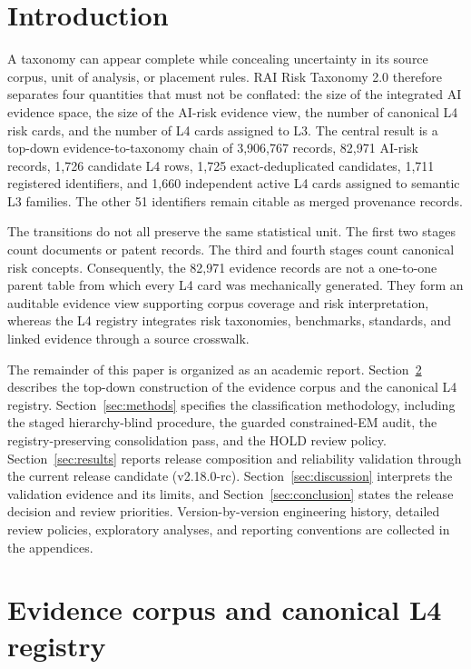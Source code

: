 \documentclass[11pt,a4paper]{article}
\begin{document}
\section{Introduction}
\label{sec:intro}

A taxonomy can appear complete while concealing uncertainty in its source
corpus, unit of analysis, or placement rules. RAI Risk Taxonomy 2.0 therefore
separates four quantities that must not be conflated: the size of the integrated
AI evidence space, the size of the AI-risk evidence view, the number of
canonical L4 risk cards, and the number of L4 cards assigned to L3. The central
result is a top-down evidence-to-taxonomy chain of 3,906,767 records, 82,971
AI-risk records, 1,726 candidate L4 rows, 1,725 exact-deduplicated candidates,
1,711 registered identifiers, and 1,660 independent active L4 cards assigned
to semantic L3 families. The other 51 identifiers remain citable as merged
provenance records.

The transitions do not all preserve the same statistical unit. The first two
stages count documents or patent records. The third and fourth stages count
canonical risk concepts. Consequently, the 82,971 evidence records are not a
one-to-one parent table from which every L4 card was mechanically generated.
They form an auditable evidence view supporting corpus coverage and risk
interpretation, whereas the L4 registry integrates risk taxonomies, benchmarks,
standards, and linked evidence through a source crosswalk.


The remainder of this paper is organized as an academic report. Section~\ref{sec:data}
describes the top-down construction of the evidence corpus and the canonical L4
registry. Section~\ref{sec:methods} specifies the classification methodology,
including the staged hierarchy-blind procedure, the guarded constrained-EM audit,
the registry-preserving consolidation pass, and the HOLD review policy.
Section~\ref{sec:results} reports release composition and reliability validation
through the current release candidate (v2.18.0-rc). Section~\ref{sec:discussion}
interprets the validation evidence and its limits, and Section~\ref{sec:conclusion}
states the release decision and review priorities. Version-by-version engineering
history, detailed review policies, exploratory analyses, and reporting conventions
are collected in the appendices.

\section{Evidence corpus and canonical L4 registry}
\label{sec:data}
\end{document}
